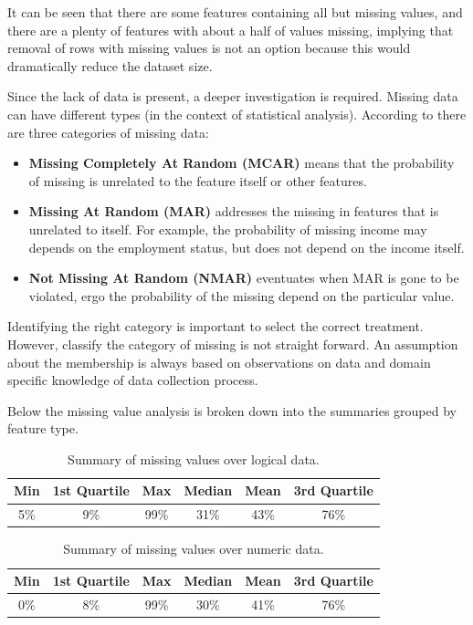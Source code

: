 It can be seen that there are some features containing all but missing values, and there are a plenty of features with about a half of values missing, implying that removal of rows with missing values is not an option because this would dramatically reduce the dataset size.

Since the lack of data is present, a deeper investigation is required. Missing data can have different types (in the context of statistical analysis). According to \cite{Allison:2007} there are three categories of missing data:

 \begin{itemize}
    \item \textbf{Missing Completely At Random (MCAR)} means that the probability of missing is unrelated to the feature itself or other features. 
    \item \textbf{Missing At Random (MAR)} addresses the missing in features that is unrelated to itself. For example, the probability of missing income may depends on the employment status, but does not depend on the income itself.
    \item \textbf{Not Missing At Random (NMAR)} eventuates when MAR is gone to be violated, ergo the probability of the missing depend on the particular value.
 \end{itemize}

Identifying the right category is important to select the correct treatment. However, classify the category of missing is not straight forward. An assumption about the membership is always based on observations on data and domain specific knowledge of data collection process.

Below the missing value analysis is broken down into the summaries grouped by feature type.

 \begin{table}[h!]
  \begin{center}
    \caption{Summary of missing values over logical data.}
    \label{tab:missings-over-logical}
    \begin{tabular}{c|c|c|c|c|c}
    Min & 1st Quartile & Max & Median & Mean & 3rd Quartile \\
      \hline
     5\% & 9\% & 99\% & 31\% & 43\% & 76\% \\ 
     \hline 
    \end{tabular}
  \end{center}
\end{table}
 
 \begin{table}[h!]
  \begin{center}
    \caption{Summary of missing values over numeric data.}
    \label{tab:missings-over-numeric}
    \begin{tabular}{c|c|c|c|c|c}
    Min & 1st Quartile & Max & Median & Mean & 3rd Quartile \\
      \hline
     0\% & 8\% & 99\% & 30\% & 41\% & 76\% \\ 
     \hline 
    \end{tabular}
  \end{center}
\end{table}
   

